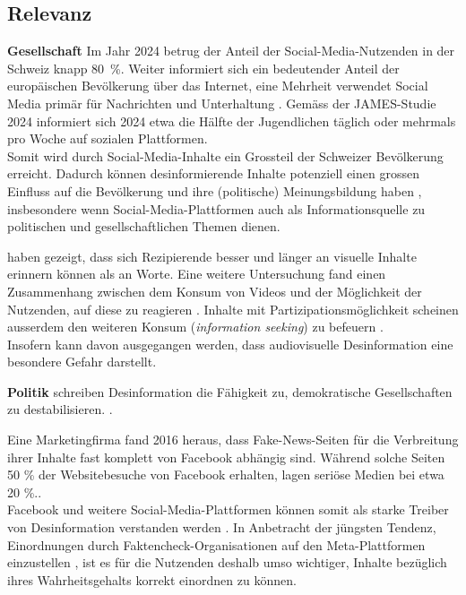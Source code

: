 \documentclass[12pt,a4paper]{article}        %
\begin{document}
\subsection{Relevanz}
\textbf{Gesellschaft}
\linebreak
Im Jahr 2024 betrug der Anteil der Social-Media-Nutzenden in der Schweiz knapp 80 \%. Weiter informiert sich ein bedeutender Anteil der europäischen Bevölkerung über das Internet, eine Mehrheit verwendet Social Media primär für Nachrichten und Unterhaltung \parencite[21ff]{we_are_social_anteil_2024}. Gemäss der JAMES-Studie 2024 \parencite[40]{kulling-knecht_james_2024} informiert sich 2024 etwa die Hälfte der Jugendlichen täglich oder mehrmals pro Woche auf sozialen Plattformen. \\
Somit wird durch Social-Media-Inhalte ein Grossteil der Schweizer Bevölkerung erreicht. Dadurch können desinformierende Inhalte potenziell einen grossen Einfluss auf die Bevölkerung und ihre (politische) Meinungsbildung haben \parencites[18]{grujic_warnhinweise_2024}[258]{hohlfeld_schlechte_2020}[1f]{khan_fake_2021}, insbesondere wenn Social-Media-Plattformen auch als Informationsquelle zu politischen und gesellschaftlichen Themen dienen.

\textcite{grady_neural_1998} haben gezeigt, dass sich Rezipierende besser und länger an visuelle Inhalte erinnern können als an Worte. Eine weitere Untersuchung fand einen Zusammenhang zwischen dem Konsum von Videos und der Möglichkeit der Nutzenden, auf diese zu reagieren \parencite[242]{khan_social_2017}. Inhalte mit Partizipationsmöglichkeit scheinen ausserdem den weiteren Konsum (\textit{information seeking}) zu befeuern \parencite[243]{khan_social_2017}. \\
Insofern kann davon ausgegangen werden, dass audiovisuelle Desinformation eine besondere Gefahr darstellt. 

\textbf{Politik}
\linebreak
\textcite[258]{hohlfeld_schlechte_2020} schreiben Desinformation die Fähigkeit zu, demokratische Gesellschaften  zu destabilisieren. \parencite[vgl.\ auch][1]{khan_fake_2021}.

Eine Marketingfirma fand 2016 heraus, dass Fake-News-Seiten für die Verbreitung ihrer Inhalte fast komplett  von Facebook abhängig sind. Während solche Seiten 50 \% der Websitebesuche von Facebook erhalten, lagen seriöse Medien bei etwa 20 \%.\parencites{wong_almost_2016}[zit.\ nach][1]{khan_fake_2021}[vgl.\ auch][212]{allcott_social_2017}. \\
Facebook und weitere Social-Media-Plattformen können somit als starke Treiber von Desinformation verstanden werden \parencite{wong_almost_2016}. In Anbetracht der jüngsten Tendenz, Einordnungen durch Faktencheck-Organisationen auf den Meta-Plattformen einzustellen \parencites{isaac_meta_2025}{meta_transparency_centre_penalties_2025}, ist es für die Nutzenden deshalb umso wichtiger, Inhalte bezüglich ihres Wahrheitsgehalts korrekt einordnen zu können. 
\end{document}
